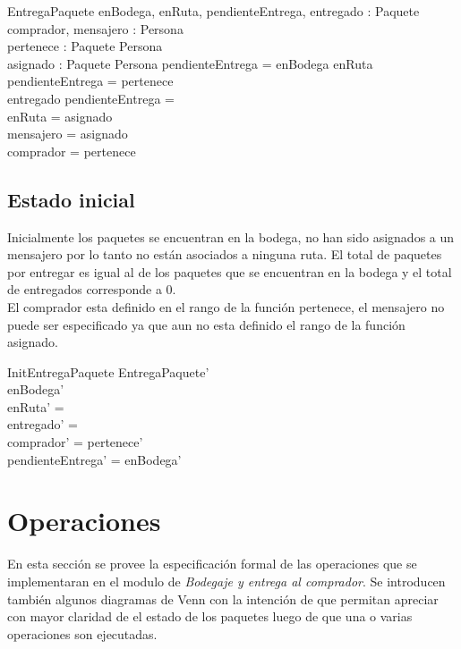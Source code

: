 \documentclass[12pt,a4paper]{article}
\begin{document}
\begin{schema}{EntregaPaquete}
enBodega, enRuta, pendienteEntrega, entregado : \power Paquete\\
comprador, mensajero : \power Persona\\
pertenece : Paquete \pfun Persona\\
asignado : Paquete \pfun Persona
\where
pendienteEntrega = enBodega \cup enRuta \\
pendienteEntrega = \dom pertenece \\
entregado \cap pendienteEntrega = \emptyset \\
enRuta = \dom asignado\\
mensajero = \ran asignado\\
comprador = \ran pertenece
\end{schema}

\subsection{Estado inicial}

Inicialmente los paquetes se encuentran en la bodega, no han sido asignados a un mensajero por lo tanto no están asociados a ninguna ruta. El total de paquetes por entregar es igual al de los paquetes que se encuentran en la bodega y el total de entregados corresponde a 0.\\
El comprador esta definido en el rango de la función pertenece, el mensajero no puede ser especificado ya que aun no esta definido el rango de la función asignado.

\begin{schema}{InitEntregaPaquete}
EntregaPaquete'\\
\where
enBodega' \neq \emptyset\\
enRuta' = \emptyset\\
entregado' = \emptyset\\
comprador' = \ran pertenece'\\
pendienteEntrega' = enBodega'
\end{schema}

\section{Operaciones}

En esta sección se provee la especificación formal de las operaciones que se implementaran en el modulo de \textit{Bodegaje y entrega al comprador}. Se introducen también algunos diagramas de Venn con la intención de que permitan apreciar con mayor claridad de el estado de los paquetes luego de que una o varias operaciones son ejecutadas.
\end{document}
